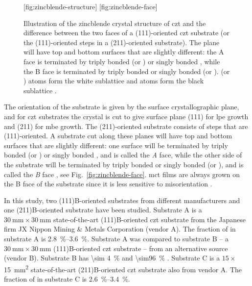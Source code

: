 \begin{figure}[htbp]
    \centering
    [fig:zincblende-structure]
    \hfill
    [fig:zincblende-face]
    \caption[Crystal structure of \ac{czt}.]{Illustration of  the zincblende crystal structure of \ac{czt} and  the difference between the two faces of a (111)-oriented \ac{czt} substrate (or the (111)-oriented steps in a (211)-oriented substrate). The plane will have top and bottom surfaces that are slightly different: the A face is terminated by triply bonded  (or ) or singly bonded , while the B face is terminated by triply bonded  or singly bonded  (or ).  (or ) atoms form the white sublattice and  atoms form the black sublattice \citep[Adapted from][]{sivananthan1986relation}.}
    \label{fig:zincblende}
\end{figure}

The orientation of the substrate is given by the surface crystallographic plane, and for \ac{czt} substrates the crystal is cut to give surface plane (111) for \ac{lpe} growth and (211) for \ac{mbe} growth. The (211)-oriented substrate consists of steps that are (111)-oriented. A substrate cut along these planes will have top and bottom surfaces that are slightly different: one surface will be terminated by triply bonded  (or ) or singly bonded , and is called the \emph{A} face, while the other side of the substrate will be terminated by triply bonded  or singly bonded  (or ), and is called the \emph{B} face \citep{sivananthan1986relation}, see Fig.~\ref{fig:zincblende-face}. \Ac{mct} films are always grown on the B face of the substrate since it is less sensitive to misorientation \citep{parker1988terracing, edwall1984liquid}.

In this study, two (111)B-oriented substrates from different manufacturers and one (211)B-oriented substrate have been studied. Substrate A is a $\SI{30}{\milli\metre}\times\SI{30}{\milli\metre}$ state-of-the-art (111)B-oriented \ac{czt} substrate from the Japanese firm JX Nippon Mining \& Metals Corporation (vendor A). The fraction of  in substrate A is \SIrange{2.8}{3.6}{\percent}. Substrate A was compared to substrate B -- a $\SI{30}{\milli\metre}\times\SI{30}{\milli\metre}$ (111)B-oriented \ac{czt} substrate -- from an alternative source (vendor B). Substrate B has \SI{\sim 4}{\percent}  and \SI{\sim96}{\percent} . Substrate C is a $15\times$\SI{15}{\milli\metre^2} state-of-the-art (211)B-oriented \ac{czt} substrate also from vendor A. The fraction of  in substrate C is \SIrange{2.6}{3.4}{\percent}. %

